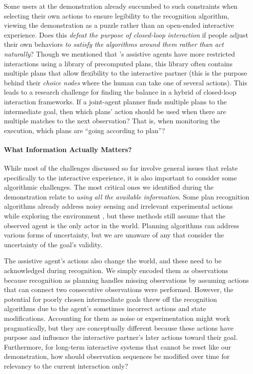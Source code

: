\documentclass[letterpaper]{article} %
\begin{document}
Some users at the demonstration already succumbed to such constraints when selecting their own actions to ensure legibility to the recognition algorithm, viewing the demonstration as a puzzle rather than an open-ended interactive experience.  Does this \textit{defeat the purpose of closed-loop interaction} if people adjust their own behaviors \textit{to satisfy the algorithms around them rather than act naturally}?  Though we mentioned that \citeauthor{jair_levineWilliams}'s  assistive agents have more restricted interactions using %
a library of precomputed plans, this library often contains multiple plans that allow flexibility to the interactive partner (this is the purpose behind their \textit{choice nodes} where the human can take one of several actions).  This leads to a research challenge for finding the balance in a hybrid of closed-loop interaction frameworks.  If a joint-agent planner finds multiple plans to the intermediate goal, then which plans' action should be used when there are multiple matches to the next observation?  That is, when monitoring the execution, which plans are ``going according to plan''?




\paragraph{What Information Actually Matters?} While most of the challenges discussed so far involve general issues that relate specifically to the interactive experience, it is also important to consider some algorithmic challenges. %
The most critical ones we identified during the demonstration relate to \textit{using all the available information}.  Some plan recognition algorithms already address noisy sensing \cite{DBLP:conf/ijcai/SohrabiRU16} and irrelevant experimental actions while exploring the environment \cite{DBLP:journals/tist/MirskyGS17}, but these methods still assume that the observed agent is the only actor in the world.  Planning algorithms can address various forms of uncertainty, but we are unaware of any that consider the uncertainty of the goal's validity.

The assistive agent's actions also change the world, and these need to be acknowledged during recognition.  We simply encoded them as observations because recognition as planning handles missing observations by assuming actions %
that can connect two consecutive observations %
were performed.  However, the potential for poorly chosen intermediate goals %
threw off the recognition algorithms due to the agent's sometimes incorrect actions and state modifications.  Accounting for them as noise or experimentation might work pragmatically, but they are conceptually different because these actions have purpose and influence the interactive partner's later actions toward their goal.  Furthermore, for long-term interactive systems that cannot be reset like our demonstration, how should observation sequences be modified over time for relevancy to the current interaction only?
\end{document}
